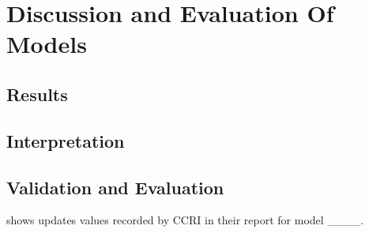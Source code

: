 \section{Discussion and Evaluation Of Models}
\subsection{Results}
\subsection{Interpretation}


\subsection{Validation and Evaluation}


 shows updates values recorded by CCRI in their report \cite{CryptoCarbonRatingsInstitute2022TheNetwork} for model \_\_\_\_. %

